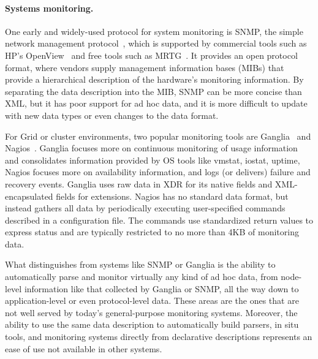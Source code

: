 \paragraph*{Systems monitoring.}
One early and widely-used protocol for system monitoring is SNMP, the
simple network management protocol~\cite{snmprfc1157}, which is
supported by commercial tools such as HP's OpenView~\cite{openview}
and free tools such as MRTG~\cite{mrtg}. It provides an open protocol
format, where vendors supply management information bases (MIBs)
that provide a hierarchical description of the hardware's monitoring
information. By separating the data description into the MIB, SNMP
can be more concise than XML, but it has poor support for ad hoc
data, and it is more difficult to update with new data types or even 
changes to the data format.

For Grid or cluster environments, two popular monitoring tools are
Ganglia~\cite{ganglia} and Nagios~\cite{nagios}.  Ganglia focuses more
on continuous monitoring of usage information and consolidates
information provided by OS tools like vmstat, iostat, uptime,
\etc{} Nagios focuses more on availability information, and logs (or
delivers) failure and recovery events. Ganglia uses raw data in XDR
for its native fields and XML-encapsulated fields for extensions.
Nagios has no standard data format, but instead gathers all data by
periodically executing user-specified commands described in a
configuration file. The commands use standardized return values to
express status and are typically restricted to no more than 4KB of
monitoring data.

What distinguishes \padsd{} from systems like SNMP or Ganglia is the
ability to automatically parse and monitor virtually any kind of
ad hoc data, from node-level information like that collected by
Ganglia or SNMP, all the way down to application-level or even
protocol-level data. These areas are the ones that are not well served
by today's general-purpose monitoring systems. Moreover, the ability
to use the same data description to automatically build parsers, 
in situ tools, and monitoring systems directly from declarative
descriptions represents an ease of use not
available in other systems. 


